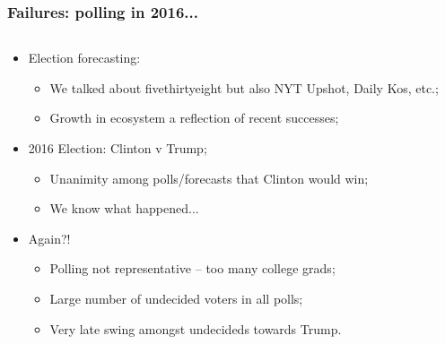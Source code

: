 \documentclass[aspectratio=169]{beamer}
\theoremstyle{principle}
\begin{document}
\begin{frame}
\frametitle{Failures: polling in 2016...}

\begin{columns}
\begin{column}{0.5\textwidth}


\begin{itemize}
\item Election forecasting:
\begin{itemize}
\item We talked about fivethirtyeight but also NYT Upshot, Daily Kos, etc.;
\item Growth in ecosystem a reflection of recent successes;
\end{itemize}

\item 2016 Election: Clinton v Trump;
\begin{itemize}
\item Unanimity among polls/forecasts that Clinton would win;
\item We know what happened...
\end{itemize}

\item Again?!
\begin{itemize}
\item Polling not representative -- too many college grads;
\item Large number of undecided voters in all polls;
\item Very late swing amongst undecideds towards Trump.
\end{itemize}
\end{itemize}


\end{column}
\end{columns}
\end{frame}
\end{document}
